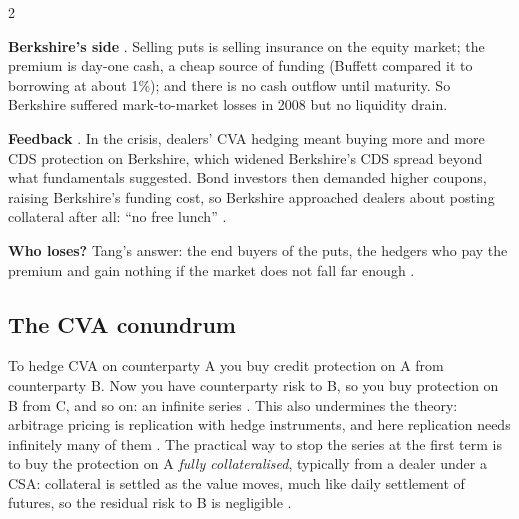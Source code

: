 \begin{paracol}{2}
\begin{casestudy}
\textbf{Berkshire's side} . Selling puts is selling insurance on the equity market; the premium
is day-one cash, a cheap source of funding (Buffett compared it to borrowing at about 1\%); and there is no cash
outflow until maturity. So Berkshire suffered mark-to-market losses in 2008 but no liquidity drain.

\textbf{Feedback} . In the crisis, dealers' CVA hedging meant buying more and more CDS
protection on Berkshire, which widened Berkshire's CDS spread beyond what fundamentals suggested. Bond investors
then demanded higher coupons, raising Berkshire's funding cost, so Berkshire approached dealers about posting
collateral after all: ``no free lunch'' .

\textbf{Who loses?} Tang's answer: the end buyers of the puts, the hedgers who pay the premium and gain nothing if
the market does not fall far enough .
\end{casestudy}

\subsection{The CVA conundrum}
To hedge CVA on counterparty A you buy credit protection on A from counterparty B. Now you have counterparty risk
to B, so you buy protection on B from C, and so on: an infinite series . This also undermines
the theory: arbitrage pricing is replication with hedge instruments, and here replication needs infinitely many
of them . The practical way to stop the series at the first term is to buy the protection on A
\emph{fully collateralised}, typically from a dealer under a CSA: collateral is settled as the value moves, much
like daily settlement of futures, so the residual risk to B is negligible .


\end{paracol}

